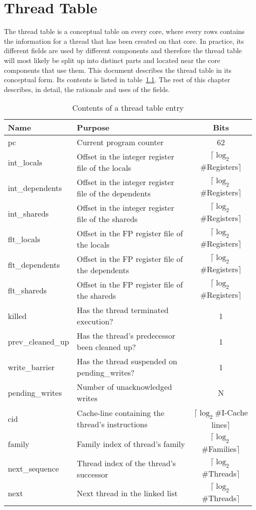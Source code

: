 \chapter{Thread Table}

The thread table is a conceptual table on every core, where every rows contains the information for a thread that has been created on that core. In practice, its different fields are used by different components and therefore the thread table will most likely be split up into distinct parts and located near the core components that use them. This document describes the thread table in its conceptual form. Its contents is listed in table~\ref{table:thread_contents}. The rest of this chapter describes, in detail, the rationale and uses of the fields.

\begin{table}
\begin{center}
\begin{tabularx}{\textwidth}{|l|X|c|}
\hline
Name & Purpose & Bits\\
\hline
\hline
pc & Current program counter & 62\\
int\_locals     & Offset in the integer register file of the locals     & $\lceil \log_2$\#Registers$\rceil$\\
int\_dependents & Offset in the integer register file of the dependents & $\lceil \log_2$\#Registers$\rceil$\\
int\_shareds    & Offset in the integer register file of the shareds    & $\lceil \log_2$\#Registers$\rceil$\\
flt\_locals     & Offset in the FP register file of the locals     & $\lceil \log_2$\#Registers$\rceil$\\
flt\_dependents & Offset in the FP register file of the dependents & $\lceil \log_2$\#Registers$\rceil$\\
flt\_shareds    & Offset in the FP register file of the shareds    & $\lceil \log_2$\#Registers$\rceil$\\
killed & Has the thread terminated execution? & 1\\
prev\_cleaned\_up & Has the thread's predecessor been cleaned up?& 1\\
write\_barrier & Has the thread suspended on pending\_writes? & 1\\
pending\_writes & Number of unacknowledged writes & N \\
cid & Cache-line containing the thread's instructions & $\lceil \log_2$\#I-Cache lines$\rceil$\\
family & Family index of thread's family & $\lceil \log_2$\#Families$\rceil$\\
next\_sequence & Thread index of the thread's successor & $\lceil \log_2$\#Threads$\rceil$\\
next & Next thread in the linked list & $\lceil \log_2$\#Threads$\rceil$\\
\hline
\end{tabularx}
\caption{Contents of a thread table entry}
\label{table:thread_contents}
\end{center}
\end{table}

